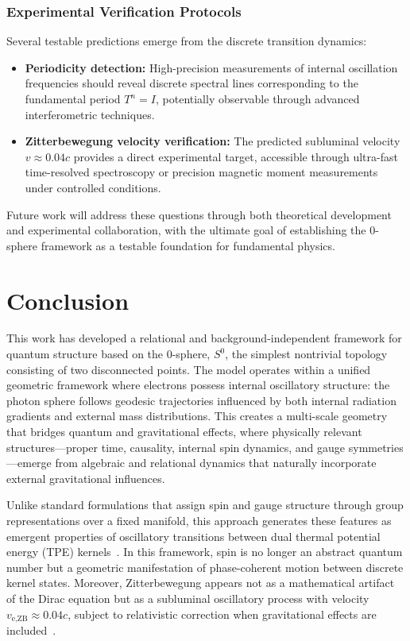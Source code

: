 \documentclass[%
 reprint,
 amsmath,amssymb,
 aps,
]{revtex4-1}
\numberwithin{equation}{section}%
\begin{document}
\subsubsection{Experimental Verification Protocols}
\label{subsubsec:experimental_verification}

Several testable predictions emerge from the discrete transition dynamics:

\begin{itemize}
\item \textbf{Periodicity detection:} High-precision measurements of internal 
oscillation frequencies should reveal discrete spectral lines corresponding to the fundamental period $T^n = I$, potentially observable through advanced interferometric techniques.

\item \textbf{Zitterbewegung velocity verification:} The predicted subluminal 
velocity $v \approx 0.04c$ provides a direct experimental target, accessible through ultra-fast time-resolved spectroscopy or precision magnetic moment measurements under controlled conditions.
\end{itemize}

Future work will address these questions through both theoretical development and experimental collaboration, with the ultimate goal of establishing the 0-sphere framework as a testable foundation for fundamental physics.


\section{Conclusion}
\label{sec:conclusion}

This work has developed a relational and background-independent framework for quantum structure based on the 0-sphere, $S^0$, the simplest nontrivial topology consisting of two disconnected points. The model operates within a unified geometric framework where electrons possess internal oscillatory structure: the photon sphere follows geodesic trajectories influenced by both internal radiation gradients and external mass distributions. This creates a multi-scale geometry that bridges quantum and gravitational effects, where physically relevant structures—proper time, causality, internal spin dynamics, and gauge symmetries—emerge from algebraic and relational dynamics that naturally incorporate external gravitational influences.

Unlike standard formulations that assign spin and gauge structure through group representations over a fixed manifold, this approach generates these features as emergent properties of oscillatory transitions between dual thermal potential energy (TPE) kernels~\cite{hanamura2309.0047}. In this framework, spin is no longer an abstract quantum number but a geometric manifestation of phase-coherent motion between discrete kernel states. Moreover, Zitterbewegung appears not as a mathematical artifact of the Dirac equation but as a subluminal oscillatory process with velocity $v_{\text{e,ZB}} \approx 0.04c$, subject to relativistic correction when gravitational effects are included~\cite{hanamura2501.0130}.
\end{document}
